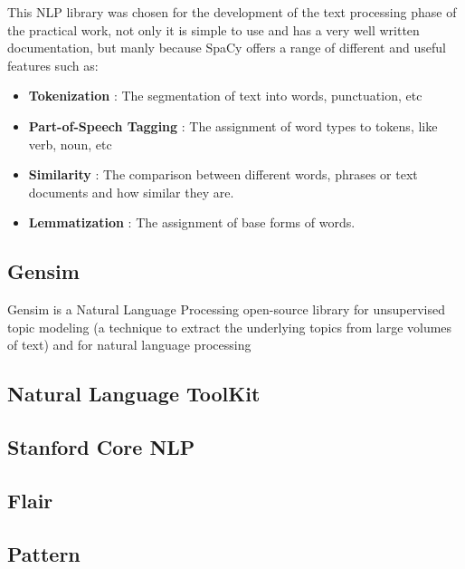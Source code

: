         \par This NLP library was chosen for the development of the text processing phase of the practical work, not only it is simple to use and has a very well written documentation, but manly because SpaCy offers a range of different and useful features such as:

        \begin{itemize}
            \item \textbf{Tokenization} : The segmentation of text into words, punctuation, etc
            \item \textbf{Part-of-Speech Tagging} : The assignment of word types to tokens, like verb, noun, etc
            \item \textbf{Similarity} : The comparison between different words, phrases or text documents and how similar they are.
            \item \textbf{Lemmatization} : The assignment of base forms of words.
        \end{itemize}

        \subsection{Gensim}

        \par Gensim is a Natural Language Processing open-source library for unsupervised topic modeling (a technique to extract the underlying topics from large volumes of text)  and for natural language processing


        \subsection{Natural Language ToolKit}

        \subsection{Stanford Core NLP}

        \subsection{Flair}

        \subsection{Pattern}